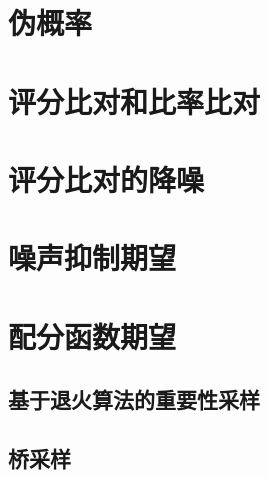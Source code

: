 \section{伪概率}
\label{sec:18.3}

\section{评分比对和比率比对}
\label{sec:18.4}

\section{评分比对的降噪}
\label{sec:18.5}

\section{噪声抑制期望}
\label{sec:18.6}

\section{配分函数期望}
\label{sec:18.7}

\subsection{基于退火算法的重要性采样}
\label{sec:18.7.1}

\subsection{桥采样}
\label{sec:18.7.2}